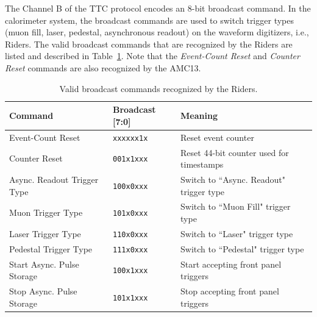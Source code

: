 The Channel B of the TTC protocol encodes an 8-bit broadcast command.  In the calorimeter system, the broadcast commands are used to switch trigger types (muon fill, laser, pedestal, asynchronous readout) on the waveform digitizers, i.e., Riders.  The valid broadcast commands that are recognized by the Riders are listed and described in Table~\ref{broadcast}.  Note that the \emph{Event-Count Reset} and \emph{Counter Reset} commands are also recognized by the AMC13.

{
\renewcommand{\arraystretch}{1.25}
\begin{table}[t]
\centering
\begin{tabular}{| l | l | l |}
\hline
Command 				& Broadcast [7:0]	& Meaning \\ \hline \hline
Event-Count Reset 			& \verb|xxxxxx1x| 	& Reset event counter \\
Counter Reset 				& \verb|001x1xxx| 	& Reset 44-bit counter used for timestamps \\ \hline
Async. Readout Trigger Type	& \verb|100x0xxx| 	& Switch to ``Async. Readout" trigger type \\
Muon Trigger Type 			& \verb|101x0xxx| 	& Switch to ``Muon Fill" trigger type \\
Laser Trigger Type 			& \verb|110x0xxx| 	& Switch to ``Laser" trigger type \\
Pedestal Trigger Type		& \verb|111x0xxx|	& Switch to ``Pedestal" trigger type \\ \hline
Start Async. Pulse Storage 	& \verb|100x1xxx| 	& Start accepting front panel triggers \\
Stop Async. Pulse Storage 	& \verb|101x1xxx| 	& Stop accepting front panel triggers \\
\hline
\end{tabular}
\caption{Valid broadcast commands recognized by the Riders.}
\label{broadcast}
\end{table}
}
